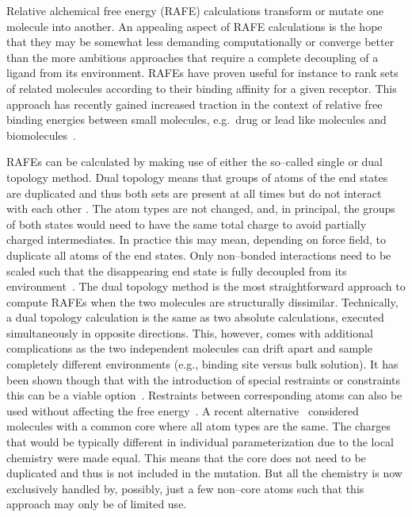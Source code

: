 \documentclass[journal=jctcce,manuscript=article]{achemso}
\begin{document}
Relative alchemical free energy (RAFE) calculations transform or
mutate one molecule into another. 
An appealing aspect of RAFE calculations is the hope that they may be somewhat less demanding computationally
or converge better than the more ambitious approaches that require a complete decoupling of a ligand from its environment.
RAFEs have proven useful for
instance to rank sets of related molecules according to their binding
affinity for a given receptor. This approach has
recently gained increased traction in the context of relative free
binding energies between small molecules, e.g.\ drug or lead like
molecules and biomolecules~\cite{doi:10.1021/ja512751q,
  doi:10.1021/acs.jctc.6b00991}.

RAFEs can be calculated by making use of either the so--called single or dual topology method.
Dual topology means that groups of atoms of the end states are
duplicated and thus both sets are present at all
times but do not interact with each other \cite{doi:10.1021/j100056a020, doi:10.1021/jp981628n}.  The atom types are not changed, and, in principal, the groups
of both states would need to have the same total charge to avoid partially
charged intermediates.  In practice this may mean, depending on force field,
to duplicate all atoms of the end states.  Only non--bonded
interactions need to be scaled such that the disappearing end state
is fully decoupled from its environment~\cite{doi:10.1021/jp981628n}.
The dual topology method is the most straightforward approach to compute RAFEs when the two molecules are structurally dissimilar.
Technically, a dual topology calculation is the same as two absolute calculations, executed simultaneously in opposite directions.
This, however, comes with additional complications as the two independent
molecules can drift apart and sample completely different environments (e.g., binding site versus bulk solution).
It has been shown though that with the introduction of
special restraints or constraints this can be a viable
option~\cite{doi:10.1021/ct700081t, rocklin_separated_2013, JCC:Axelsen-Li}.
Restraints between corresponding atoms can also be used without affecting the free
energy~\cite{JCC:Axelsen-Li}.  A recent
alternative~\cite{doi:10.1021/acs.jctc.5b00179} considered molecules with a
common core where all atom types are the same.  The charges that would be
typically different in individual parameterization due to the local chemistry
were made equal.  This means that the core does not need to be duplicated and
thus is not included in the mutation.  But all the chemistry is now exclusively
handled by, possibly, just a few non--core atoms such that this approach may
only be of limited use.
\end{document}
